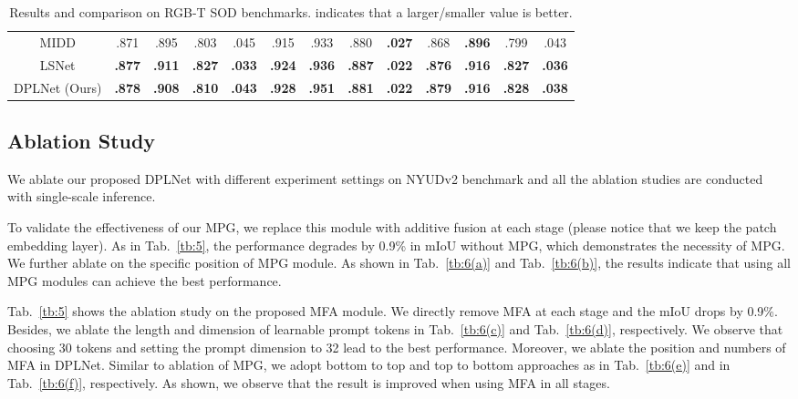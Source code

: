 \documentclass[10pt,twocolumn,letterpaper]{article}
\begin{document}
\begin{table*}[t]
\begin{tabular}{ c c  c c c c |c c c c |c c c c}
\multicolumn{2}{c}{MIDD \cite{MIDD}}	&{.871}	&{.895}	&{.803}	&{.045}	&.915	&{.933}	&{.880}	&\textbf{\color{blue}.027}	&{.868}	&\textbf{\color{blue}.896}	&{.799}	&{.043}
\\
\multicolumn{2}{c}{LSNet \cite{LSNet}}	&\textbf{\color{blue}.877} &\textbf{\color{red}.911}	&\textbf{\color{red}.827} 	&\textbf{\color{red}.033}	&\textbf{\color{blue}.924}	&\textbf{\color{blue}.936}	&\textbf{\color{red}.887}	&\textbf{\color{red}.022} &\textbf{\color{blue}.876}	&\textbf{\color{red}.916}	&\textbf{\color{blue}.827}	&\textbf{\color{red}.036}
\\
\multicolumn{2}{c}{DPLNet (Ours)}
&\textbf{\color{red}.878} &\textbf{\color{blue}.908}	&\textbf{\color{blue}.810} 	&\textbf{\color{blue}.043}	&\textbf{\color{red}.928}	&\textbf{\color{red}.951}	&\textbf{\color{blue}.881}	&\textbf{\color{red}.022 } &\textbf{\color{red}.879}	&\textbf{\color{red}.916}	&\textbf{\color{red}.828}	&\textbf{\color{blue}.038}
\\
\hline
\end{tabular}
\caption{\centering Results and comparison on RGB-T SOD benchmarks.  indicates that a larger/smaller value is better.}
\label{tb:9}
\end{table*}




\subsection{Ablation Study}
\label{4.3}
We ablate our proposed DPLNet with different experiment settings on NYUDv2 benchmark \cite{nyuv2} and all the ablation studies are conducted with single-scale inference.

\vspace{0.2em}
 To validate the effectiveness of our MPG, we replace this module with additive fusion at each stage (please notice that we keep the patch embedding layer). As in Tab.~\ref{tb:5}, the performance degrades by 0.9\% in mIoU without MPG, which demonstrates the necessity of MPG. We further ablate on the specific position of MPG module. As shown in Tab.~\ref{tb:6(a)} and Tab.~\ref{tb:6(b)}, the results indicate that using all MPG modules can achieve the best performance.

\vspace{0.2em}
 Tab.~\ref{tb:5} shows the ablation study on the proposed MFA module. We directly remove MFA at each stage and the mIoU drops by 0.9\%. Besides, we ablate the length and dimension of learnable prompt tokens  in Tab.~\ref{tb:6(c)} and Tab.~\ref{tb:6(d)}, respectively. We observe that choosing 30 tokens and setting the prompt dimension to 32 lead to the best performance. Moreover, we ablate the position and numbers of MFA in DPLNet. Similar to ablation of MPG, we adopt bottom to top and top to bottom approaches as in Tab.~\ref{tb:6(e)} and in Tab.~\ref{tb:6(f)}, respectively. As shown, we observe that the result is improved when using MFA in all stages.
\end{document}
